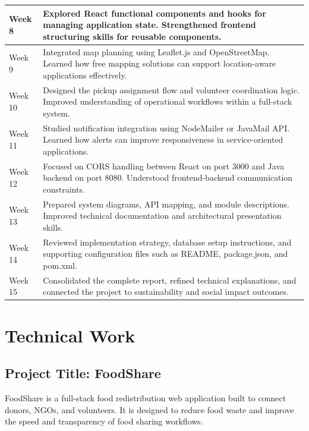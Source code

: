 \documentclass[12pt,a4paper]{report}
\newcommand{\projecttitle}{FoodShare}
\begin{document}
\begin{longtable}{|p{1.8cm}|p{11.2cm}|}
\hline
Week 8 & Explored React functional components and hooks for managing application state. Strengthened frontend structuring skills for reusable components. \\
\hline
Week 9 & Integrated map planning using Leaflet.js and OpenStreetMap. Learned how free mapping solutions can support location-aware applications effectively. \\
\hline
Week 10 & Designed the pickup assignment flow and volunteer coordination logic. Improved understanding of operational workflows within a full-stack system. \\
\hline
Week 11 & Studied notification integration using NodeMailer or JavaMail API. Learned how alerts can improve responsiveness in service-oriented applications. \\
\hline
Week 12 & Focused on CORS handling between React on port 3000 and Java backend on port 8080. Understood frontend-backend communication constraints. \\
\hline
Week 13 & Prepared system diagrams, API mapping, and module descriptions. Improved technical documentation and architectural presentation skills. \\
\hline
Week 14 & Reviewed implementation strategy, database setup instructions, and supporting configuration files such as README, package.json, and pom.xml. \\
\hline
Week 15 & Consolidated the complete report, refined technical explanations, and connected the project to sustainability and social impact outcomes. \\
\hline
\end{longtable}
\normalsize

\chapter{Technical Work}

\section{Project Title: \projecttitle}
\projecttitle{} is a full-stack food redistribution web application built to connect donors, NGOs, and volunteers. It is designed to reduce food waste and improve the speed and transparency of food sharing workflows.
\end{document}
